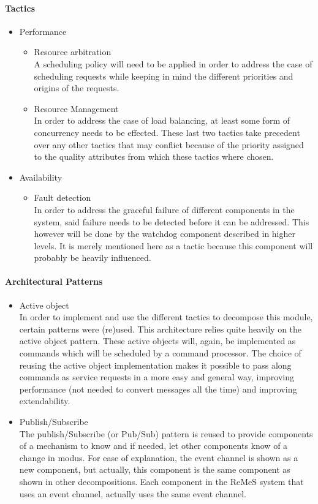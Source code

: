 \paragraph{Tactics}
\begin{itemize}
	\item{Performance}
	\begin{itemize}
		\item{Resource arbitration}\\
		A scheduling policy will need to be applied in order to address the case of scheduling requests while keeping in mind the different priorities and origins of the requests.
		\item{Resource Management}\\
		In order to address the case of load balancing, at least some form of concurrency needs to be effected. These last two tactics take precedent over any other tactics that may conflict because of the priority assigned to the quality attributes from which these tactics where chosen.
	\end{itemize}
	\item{Availability}
	\begin{itemize}
		\item{Fault detection}\\
		In order to address the graceful failure of different components in the system, said failure needs to be detected before it can be addressed. 
This however will be done by the watchdog component described in higher levels. 
It is merely mentioned here as a tactic because this component will probably be heavily influenced.
	\end{itemize}
\end{itemize}
\paragraph{Architectural Patterns}
\begin{itemize}
	\item{Active object} \\
In order to implement and use the different tactics to decompose this module, certain patterns were (re)used. 
This architecture relies quite heavily on the active object pattern. 
These active objects will, again, be implemented as commands which will be scheduled by a command processor. 
The choice of reusing the active object implementation makes it possible to pass along commands as service requests in a more easy and general way, improving performance (not needed to convert messages all the time) and improving extendability.
	\item{Publish/Subscribe}\\
	The publish/Subscribe (or Pub/Sub) pattern is reused to provide components of a mechanism to know and if needed, let other components know of a change in modus. 
For ease of explanation, the event channel is shown as a new component, but actually, this component is the same component as shown in other decompositions. 
Each component in the ReMeS system that uses an event channel, actually uses the same event channel.
\end{itemize}

